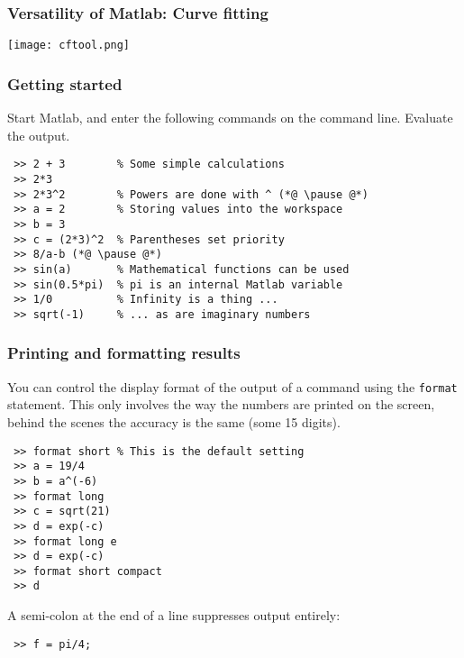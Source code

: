 \begin{frame}
\frametitle{Versatility of Matlab: Curve fitting}
\centering\texttt{[image: cftool.png]}
\end{frame}

\begin{frame}[fragile]
  \frametitle{Getting started}
   Start Matlab, and enter the following commands on the command line. Evaluate the output.
   \pause
   \begin{lstlisting}
 >> 2 + 3        % Some simple calculations
 >> 2*3
 >> 2*3^2        % Powers are done with ^ (*@ \pause @*)
 >> a = 2        % Storing values into the workspace
 >> b = 3
 >> c = (2*3)^2  % Parentheses set priority
 >> 8/a-b (*@ \pause @*)
 >> sin(a)       % Mathematical functions can be used 
 >> sin(0.5*pi)  % pi is an internal Matlab variable
 >> 1/0          % Infinity is a thing ...
 >> sqrt(-1)     % ... as are imaginary numbers
   \end{lstlisting}
 \end{frame}
 
 \begin{frame}[fragile]
   \frametitle{Printing and formatting results}
   You can control the display format of the output of a command using the \lstinline$format$ statement. This only involves the way the numbers are printed on the screen, behind the scenes the accuracy is the same (some 15 digits).
   \begin{lstlisting}
 >> format short % This is the default setting
 >> a = 19/4
 >> b = a^(-6)
 >> format long
 >> c = sqrt(21)
 >> d = exp(-c)
 >> format long e
 >> d = exp(-c)
 >> format short compact
 >> d
   \end{lstlisting}\pause
   A semi-colon at the end of a line suppresses output entirely:
   \begin{lstlisting}
 >> f = pi/4;
   \end{lstlisting}
 \end{frame}
 
